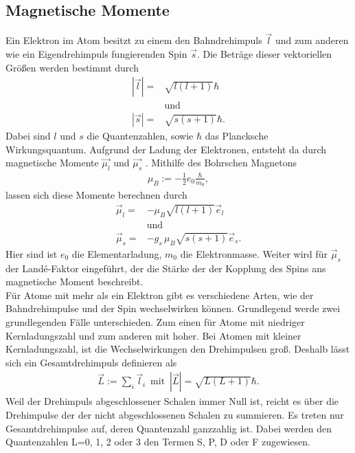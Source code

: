\subsection{Magnetische Momente}
Ein Elektron im Atom besitzt zu einem den Bahndrehimpuls $\vec{l}$ und zum anderen wie ein Eigendrehimpuls fungierenden Spin $\vec{s}$.
Die Beträge dieser vektoriellen Größen werden bestimmt durch
\begin{align}
	|\vec{l}|=&\sqrt{l(l+1)}\hbar\\
	\nonumber &\text{und}\\
	|\vec{s}|=&\sqrt{s(s+1)}\hbar.
\end{align}
Dabei sind $l$ und $s$ die Quantenzahlen, sowie $\hbar$ das Plancksche Wirkungsquantum.
Aufgrund der Ladung der Elektronen, entsteht da durch magnetische Momente $\vec{\mu_l}$ und $\vec{\mu_s}$ .
Mithilfe des Bohrschen Magnetons
\begin{align}
	\mu_B:=-\frac{1}{2}e_0 \frac{\hbar}{m_0},
\end{align}
lassen sich diese Momente berechnen durch
\begin{align}
	\vec{\mu}_l=&-\mu_B\sqrt{l(l+1)}\vec{e}_l\\
	\nonumber &\text{und}\\
	\vec{\mu}_s=&-g_s\,\mu_B\sqrt{s(s+1)}\vec{e}_s.
\end{align}
Hier sind ist $e_0$ die Elementarladung, $m_0$ die Elektronmasse.
Weiter wird für $\vec{\mu}_s$ der Landé-Faktor eingeführt, der die Stärke der der Kopplung des Spins ans magnetische Moment beschreibt.\\
Für Atome mit mehr als ein Elektron gibt es verschiedene Arten, wie der Bahndrehimpulse und der Spin wechselwirken können.
Grundlegend werde zwei grundlegenden Fälle unterschieden.
Zum einen für Atome mit niedriger Kernladungszahl und zum anderen mit hoher.
Bei Atomen mit kleiner Kernladungszahl, ist die Wechselwirkungen den Drehimpulsen groß.
Deshalb lässt sich ein Gesamtdrehimpuls definieren als
\begin{align}
	\vec{L}:=\sum_i \vec{l}_i\, \text{ mit }\, |\vec{L}|=\sqrt{L(L+1)}\hbar.
\end{align}
Weil der Drehimpuls abgeschlossener Schalen immer Null ist, reicht es über die Drehimpulse der der nicht abgeschlossenen Schalen zu summieren.
Es treten nur Gesamtdrehimpulse auf, deren Quantenzahl ganzzahlig ist.
Dabei werden den Quantenzahlen L=0, 1, 2 oder 3 den Termen S, P, D oder F zugewiesen.\\
